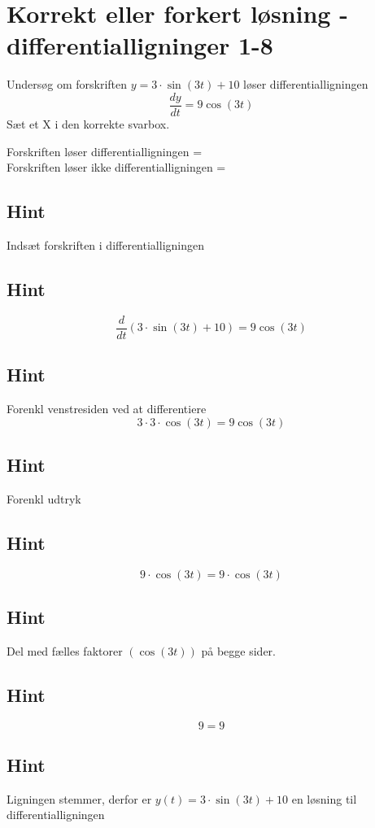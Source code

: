\documentclass{article}
\newenvironment{exercise}[1]{\newpage\section{#1}}{}
\newcommand{\answerbox}[1]{\fbox{$#1$}}
\newcommand{\hint}{\subsection*{Hint}}
\begin{document}
\begin{exercise}{Korrekt eller forkert løsning - differentialligninger 1-8}
	
	
	Undersøg om forskriften $y = 3 \cdot \sin(3t) + 10$ løser differentialligningen
	\[
	\frac{dy}{dt} = 9 \cos(3t)
	\]
	Sæt et X i den korrekte svarbox.
	
	Forskriften løser differentialligningen = \answerbox{X} \\
	
	Forskriften løser ikke differentialligningen = \answerbox{}
	
	\hint
	
	Indsæt forskriften i differentialligningen
	
	\hint
	\[
	\frac{d}{dt} \left( 3 \cdot \sin(3t) + 10 \right) = 9 \cos(3t)
	\]
	
	
	\hint
	
	Forenkl venstresiden ved at differentiere
	\[
	3 \cdot 3 \cdot \cos(3t) = 9 \cos(3t)
	\]
	
	\hint
	
	Forenkl udtryk 
	
	\hint
	\[
	9 \cdot \cos(3t) = 9 \cdot \cos(3t)
	\]
	
	\hint
	Del med fælles faktorer $\left( \cos(3t) \right)$ på begge sider.
	
	\hint
	
	\[
	9 = 9
	\]
	
	
	\hint
	
	Ligningen stemmer, derfor er $y(t) = 3 \cdot \sin(3t) + 10$ en løsning til differentialligningen
	
\end{exercise}

\newpage
\end{document}

